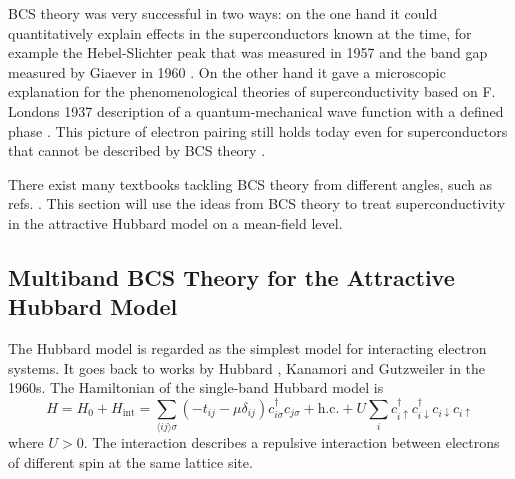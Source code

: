 \documentclass[../main.tex]{subfiles}
\begin{document}
BCS theory was very successful in two ways: on the one hand it could quantitatively explain effects in the superconductors known at the time, for example the Hebel-Slichter peak that was measured in 1957 \cite{hebelNuclearRelaxationSuperconducting1957, hebelNuclearSpinRelaxation1959} and the band gap measured by Giaever in 1960 \cite{giaeverStudySuperconductorsElectron1961}.
On the other hand it gave a microscopic explanation for the phenomenological theories of superconductivity based on F. Londons 1937 description of a quantum-mechanical wave function with a defined phase \cite{londonNewConceptionSupraconductivity1937}.
This picture of electron pairing still holds today even for superconductors that cannot be described by BCS theory \cite{zhouHightemperatureSuperconductivity2021}.

There exist many textbooks tackling BCS theory from different angles, such as refs. \cite{colemanIntroductionManyBodyPhysics2015, tinkhamIntroductionSuperconductivity1996}.
This section will use the ideas from BCS theory to treat superconductivity in the attractive Hubbard model on a mean-field level.

\subsection*{Multiband BCS Theory for the Attractive Hubbard Model}

The Hubbard model is regarded as the simplest model for interacting electron systems.
It goes back to works by Hubbard \cite{hubbardElectronCorrelationsNarrow1963}, Kanamori \cite{kanamoriElectronCorrelationFerromagnetism1963} and Gutzweiler \cite{gutzwillerEffectCorrelationFerromagnetism1963} in the 1960s.
The Hamiltonian of the  single-band Hubbard model is
\begin{equation}
	H = H_0 + H_{\mathrm{int}} 
	= \sum_{\langle i j \rangle \sigma} \left(-t_{i j} - \mu \delta_{i j}\right) c_{i \sigma}^{\dagger} c_{j \sigma} + \mathrm{h.c.} + U \sum_{i} c_{i \uparrow}^{\dagger} c_{i \downarrow}^{\dagger} c_{i \downarrow} c_{i \uparrow}
	\label{eq:Hubbard interaction repulsive}
\end{equation}
where \(U > 0\).
The interaction describes a repulsive interaction between electrons of different spin at the same lattice site.
\end{document}
